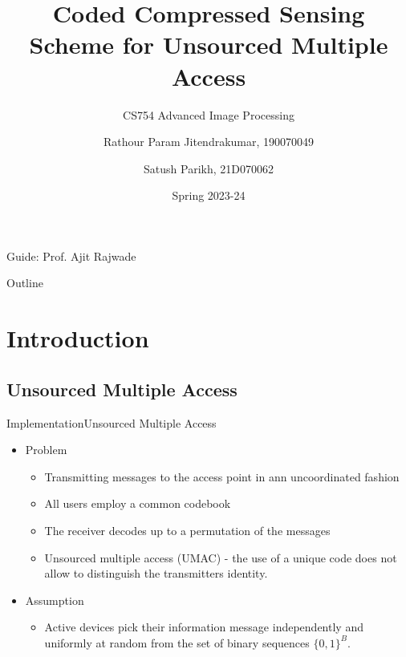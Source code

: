 \documentclass[aspectratio=169, handout, 10pt, hyperref=colorlinks]{beamer}
\title{Coded Compressed Sensing Scheme for
Unsourced Multiple Access}
\subtitle{CS754 Advanced Image Processing}
\author[Team CCS]{Rathour Param Jitendrakumar, 190070049 \texorpdfstring{\\} \ \and  Satush Parikh, 21D070062  }
\institute[IIT Bombay]{Indian Institute of Technology Bombay\\\url{https://github.com/paramrathour/Coded-Compressed-Sensing-for-Unsourced-Multiple-Access}}
\date{Spring 2023-24}
\begin{document}
\begin{frame}
  \titlepage
  \begin{center}
    Guide: Prof. Ajit Rajwade
  \end{center}
\end{frame}

\begin{frame}{Outline}
  \tableofcontents
\end{frame}



\section{Introduction}
\subsection{Unsourced Multiple Access}
\begin{frame}{Implementation}{Unsourced Multiple Access}
\begin{itemize}
    \item Problem
    \begin{itemize}
        \item Transmitting messages to the access point in ann uncoordinated fashion
            \item All users employ a common codebook 
            \item  The receiver decodes up to a permutation of the messages
            \item Unsourced multiple access (UMAC) - the use of a unique code does not allow to distinguish the transmitters identity.
        \end{itemize}
     \item Assumption
     \begin{itemize}
         \item Active devices pick their information message independently and uniformly at random from the set of binary sequences $\{0,1\}^B.$
     \end{itemize}
\end{itemize}
\end{frame}
\end{document}

